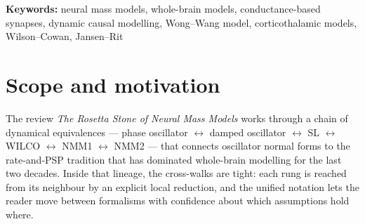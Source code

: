 \documentclass[11pt,a4paper]{article}
\begin{document}
\newpage


\begin{abstract}
\noindent
The companion review \emph{The Rosetta Stone of Neural Mass Models} develops a step-by-step cross-walk through the rate / post-synaptic-potential (PSP) lineage of neural mass models: phase oscillator $\leftrightarrow$ damped harmonic oscillator $\leftrightarrow$ Stuart--Landau (SL) $\leftrightarrow$ Wilson--Cowan (WILCO) $\leftrightarrow$ NMM1 (Jansen--Rit / Wendling / LaNMM) $\leftrightarrow$ NMM2 (Montbri\'o--Paz\'o--Roxin and theta-neuron Ott--Antonsen reductions). The roadmap table in that review acknowledges four widely used whole-brain node models that lie outside this lineage --- the conductance-based Liley-type mass, the corticothalamic Robinson-type model, the Reduced Wong--Wang / Dynamic Mean-Field (DMF) node, and the David--Friston canonical microcircuit used in dynamic causal modelling (DCM) --- but does not derive them in detail. This note is the companion that explains why: each of the four sits at a single, identifiable extension of the rate/PSP lineage, with the extension specific to (a)~the synaptic primitive (Liley), (b)~the spatial dimension (Robinson), (c)~the reduction principle linking spikes to masses (DMF), or (d)~the inferential overlay applied to the dynamics (DCM). The unified picture is summarised in a single table.

\end{abstract}

\vspace{0.5em}
\noindent\textbf{Keywords:} neural mass models, whole-brain models, conductance-based synapses, dynamic causal modelling, Wong--Wang model, corticothalamic models, Wilson--Cowan, Jansen--Rit

\clearpage
\tableofcontents
\newpage

\section{Scope and motivation}
\label{sec:intro}

The review \emph{The Rosetta Stone of Neural Mass Models}\cite{rosetta_stone} works through a chain of dynamical equivalences --- phase oscillator $\leftrightarrow$ damped oscillator $\leftrightarrow$ SL $\leftrightarrow$ WILCO $\leftrightarrow$ NMM1 $\leftrightarrow$ NMM2 --- that connects oscillator normal forms to the rate-and-PSP tradition that has dominated whole-brain modelling for the last two decades. Inside that lineage, the cross-walks are tight: each rung is reached from its neighbour by an explicit local reduction, and the unified notation lets the reader move between formalisms with confidence about which assumptions hold where.
\end{document}
